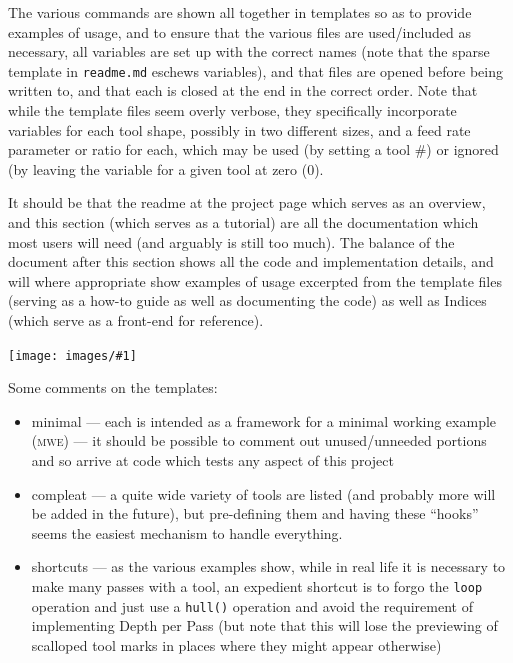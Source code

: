 \documentclass{ltxdoc}
\newcommand{\includeimage}[1]{\bigskip\noindent\texttt{[image: images/\#1]}\bigskip}
\begin{document}
The various commands are shown all together in templates so as to provide examples of usage, and to ensure that the various files are used/included as necessary, all variables are set up with the correct names (note that the sparse template in \verb|readme.md| eschews variables), and that files are opened before being written to, and that each is closed at the end in the correct order. Note that while the template files seem overly verbose, they specifically incorporate variables for each tool shape, possibly in two different sizes, and a feed rate parameter or ratio for each, which may be used (by setting a tool \#) or ignored (by leaving the variable for a given tool at zero (0). 

It should be that the readme at the project page which serves as an overview, and this section (which serves as a tutorial) are all the documentation which most users will need (and arguably is still too much). The balance of the document after this section shows all the code and implementation details, and will where appropriate show examples of usage excerpted from the template files (serving as a how-to guide as well as documenting the code) as well as Indices (which serve as a front-end for reference).

\includeimage{panorama.pdf}

Some comments on the templates:

\begin{itemize}
\item minimal --- each is intended as a framework for a minimal working example (\textsc{mwe}) --- it should be possible to comment out unused/unneeded portions and so arrive at code which tests any aspect of this project
\item compleat --- a quite wide variety of tools are listed (and probably more will be
                   added in the future), but pre-defining them and having these ``hooks''
                   seems the easiest mechanism to handle everything. 
\item shortcuts --- as the various examples show, while in real life it is necessary to 
                    make many passes with a tool, an expedient shortcut is to forgo the 
                    \verb|loop| operation and just use a \verb|hull()| operation and avoid the requirement of implementing 
                    Depth per Pass (but note that this will lose the previewing of scalloped tool 
                    marks in places where they might appear otherwise)
\end{itemize}
\end{document}
